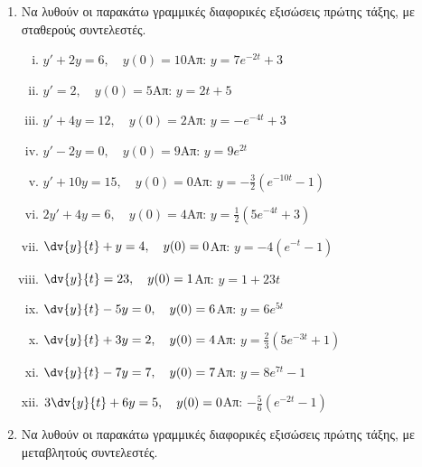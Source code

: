 


\pagestyle{askhseis}





\begin{center}
  \minibox{\large \bfseries \textcolor{Col1}{Ασκήσεις στις Διαφορικές Εξισώσεις}}
\end{center}

\vspace{\baselineskip}


\begin{enumerate}

  \item Να λυθούν οι παρακάτω γραμμικές διαφορικές εξισώσεις πρώτης τάξης, 
    με σταθερούς συντελεστές.

    \begin{enumerate}[i)]

      \item $y'+2y=6,\quad y(0)=10$\hfill Απ: $y=7e^{-2t}+3$
      \item $y'=2,\quad y(0)=5$\hfill Απ: $y=2t+5$
      \item $y'+4y=12,\quad y(0)=2$\hfill Απ: $y=-e^{-4t}+3$
      \item $y'-2y=0,\quad y(0)=9$\hfill Απ: $y=9e^{2t}$
      \item $y'+10y=15,\quad y(0)=0$\hfill Απ: $y=-\frac{3}{2}(e^{-10t}-1)$
      \item $2y'+4y=6,\quad y(0)=4$\hfill Απ: $y=\frac{1}{2}(5e^{-4t}+3)$
      \item $\dv{y}{t}+y=4,\quad y(0)=0$\hfill Απ: $y=-4(e^{-t}-1)$
      \item $\dv{y}{t}=23,\quad y(0)=1$\hfill Απ: $y=1+23t$
      \item $\dv{y}{t}-5y=0,\quad y(0)=6$\hfill Απ: $y=6e^{5t}$
      \item $\dv{y}{t}+3y=2,\quad y(0)=4$\hfill Απ: $y=\frac{2}{3}(5e^{-3t}+1)$
      \item $\dv{y}{t}-7y=7,\quad y(0)=7$\hfill Απ: $y=8e^{7t}-1$
      \item $3\dv{y}{t}+6y=5,\quad y(0)=0$\hfill Απ: $-\frac{5}{6}(e^{-2t}-1)$
    \end{enumerate}

  \item Να λυθούν οι παρακάτω γραμμικές διαφορικές εξισώσεις πρώτης τάξης, 
    με μεταβλητούς συντελεστές.

    \begin{enumerate}[i)]


\end{enumerate}
\end{enumerate}
